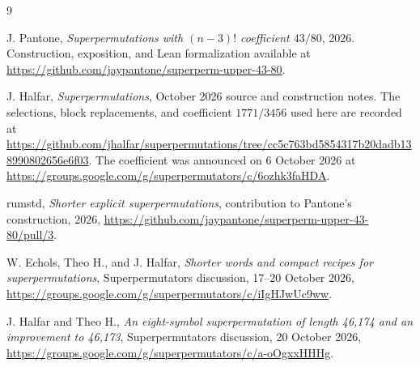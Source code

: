 \documentclass[11pt]{article}
\begin{document}
\begin{thebibliography}{9}

J. Pantone,
\emph{Superpermutations with $(n-3)!$ coefficient $43/80$},
2026. Construction, exposition, and Lean formalization available at
\url{https://github.com/jaypantone/superperm-upper-43-80}.

J. Halfar,
\emph{Superpermutations}, October 2026 source and construction notes.
The selections, block replacements, and coefficient $1771/3456$
used here are recorded at
\url{https://github.com/jhalfar/superpermutations/tree/cc5c763bd5854317b20dadb138990802656e6f03}.
The coefficient was announced on 6 October 2026 at
\url{https://groups.google.com/g/superpermutators/c/6ozhk3faHDA}.

rumstd,
\emph{Shorter explicit superpermutations}, contribution to Pantone's
construction, 2026,
\url{https://github.com/jaypantone/superperm-upper-43-80/pull/3}.

W. Echols, Theo H., and J. Halfar,
\emph{Shorter words and compact recipes for superpermutations},
Superpermutators discussion, 17--20 October 2026,
\url{https://groups.google.com/g/superpermutators/c/iIgHJwUc9ww}.

J. Halfar and Theo H.,
\emph{An eight-symbol superpermutation of length 46,174 and an improvement to 46,173},
Superpermutators discussion, 20 October 2026,
\url{https://groups.google.com/g/superpermutators/c/a-oOgxxHHHg}.

\end{thebibliography}
\end{document}
